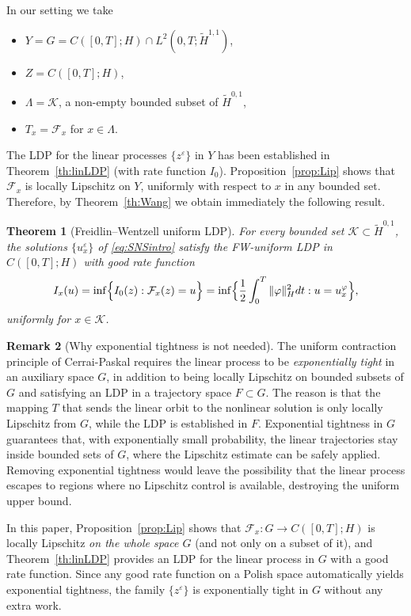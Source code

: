 \documentclass[11pt,a4paper,reqno]{amsart}
\newtheorem{theorem}{Theorem}[section]
\theoremstyle{definition}
\newtheorem{remark}[theorem]{Remark}
\begin{document}
In our setting we take
\begin{itemize}
  \item $Y = G = C([0,T];H)\cap L^2(0,T;\widetilde H^{1,1})$,
  \item $Z = C([0,T];H)$,
  \item $\Lambda = \mathcal K$, a non-empty bounded subset of $\widetilde H^{0,1}$,
  \item $T_x = \mathcal F_x$ for $x\in\Lambda$.
\end{itemize}
The LDP for the linear processes $\{z^\varepsilon\}$ in $Y$ has been established
in Theorem~\ref{th:linLDP} (with rate function $I_0$).  Proposition~\ref{prop:Lip}
shows that $\mathcal F_x$ is locally Lipschitz on $Y$, uniformly with respect to
$x$ in any bounded set.  Therefore, by Theorem~\ref{th:Wang} we obtain immediately
the following result.

\begin{theorem}[Freidlin--Wentzell uniform LDP]\label{th:FW}
  For every bounded set $\mathcal K\subset\widetilde H^{0,1}$, the solutions
  $\{u_x^\varepsilon\}$ of \eqref{eq:SNSintro} satisfy the FW-uniform LDP in
  $C([0,T];H)$ with good rate function
  \[
    I_x(u) = \inf\Bigl\{ I_0(z) : \mathcal F_x(z)=u \Bigr\}
    = \inf\Bigl\{ \frac12\int_0^T \|\varphi\|_H^2 dt : u = u_x^\varphi \Bigr\},
  \]
  uniformly for $x\in\mathcal K$.
\end{theorem}

\begin{remark}[Why exponential tightness is not needed]\label{rmk:noET}
  The uniform contraction principle of Cerrai-Paskal
  \cite[Theorem~3.3]{CP} requires the linear process to be \emph{exponentially
  tight} in an auxiliary space $G$, in addition to being locally Lipschitz
  on bounded subsets of $G$ and satisfying an LDP in a
  trajectory space $F\subset G$.  The reason is that the mapping $T$
  that sends the linear orbit to the nonlinear solution is only locally
  Lipschitz from $G$, while the LDP is established in $F$.
  Exponential tightness in $G$ guarantees that, with exponentially small
  probability, the linear trajectories stay inside bounded sets of $G$,
  where the Lipschitz estimate can be safely applied.  Removing
  exponential tightness would leave the possibility that the linear
  process escapes to regions where no Lipschitz control is available,
  destroying the uniform upper bound.

  In this paper, Proposition~\ref{prop:Lip}
  shows that $\mathcal F_x : G \to C([0,T];H)$ is locally Lipschitz
  \emph{on the whole space $G$} (and not only on a subset of it), and
  Theorem~\ref{th:linLDP} provides an LDP for the linear process in $G$
  with a good rate function.  Since any good rate function on a Polish
  space automatically yields exponential tightness, the family
  $\{z^\varepsilon\}$ is exponentially tight in $G$ without any extra
  work.
\end{remark}
\end{document}

